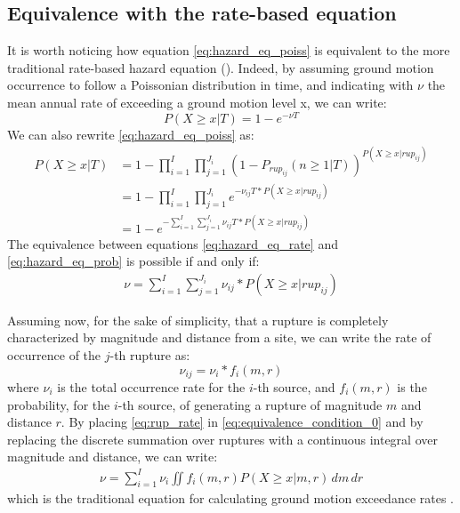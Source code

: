 \subsection{Equivalence with the rate-based equation}
It is worth noticing how equation \ref{eq:hazard_eq_poiss} is equivalent to the more traditional rate-based
hazard equation (\cite{mcguire1995}). Indeed, by assuming ground motion occurrence to follow a Poissonian
distribution in time, and indicating with $\nu$ the mean annual rate of exceeding a ground motion level x,
we can write:
\begin{equation}
\label{eq:hazard_eq_rate}
P(X \ge x | T) = 1 - e ^ {- \nu T}
\end{equation}
We can also rewrite \ref{eq:hazard_eq_poiss} as:
\begin{align}
\label{eq:hazard_eq_prob}
P(X \ge x | T) &= 1 - \prod_{i=1}^{I} \prod_{j=1}^{J_{i}} (1 - P_{rup_{ij}}(n \ge 1 | T))^{P(X \ge x | rup_{ij})} \nonumber \\
		      &= 1 - \prod_{i=1}^{I} \prod_{j=1}^{J_{i}} e^{-\nu_{ij} T * P(X \ge x | rup_{ij})} \nonumber \\
		      & = 1 - e ^ {- \sum_{i=1}^{I} \sum_{j=1}^{J_{i}} \nu_{ij} T * P(X \ge x | rup_{ij})}
\end{align}
The equivalence between equations \ref{eq:hazard_eq_rate} and \ref{eq:hazard_eq_prob} is possible if and only if:
\begin{align}
\label{eq:equivalence_condition_0}
\nu  =  \sum_{i=1}^{I} \sum_{j=1}^{J_{i}} \nu_{ij} * P(X \ge x | rup_{ij})
\end{align}

Assuming now, for the sake of simplicity, that a rupture is completely characterized by magnitude and distance from a site, we
can write the rate of occurrence of the $j$-th rupture as:
\begin{equation}
\label{eq:rup_rate}
\nu_{ij} = \nu_{i} * f_{i}(m, r)
\end{equation}
where $\nu_{i}$ is the total occurrence rate for the $i$-th source, and $f_{i}(m, r)$ is the probability, for the $i$-th source, of
generating a rupture of magnitude $m$ and distance $r$. By placing \ref{eq:rup_rate} in \ref{eq:equivalence_condition_0} and
by replacing the discrete summation over ruptures with a continuous integral over magnitude and distance, we can write:
\begin{align}
\nu = \sum_{i=1}^{I} \nu_{i} \iint f_{i}(m, r) P(X \ge x | m, r)\,dm \,dr
\end{align}
which is the traditional equation for calculating ground motion exceedance rates
\citep{mcguire1995}.

